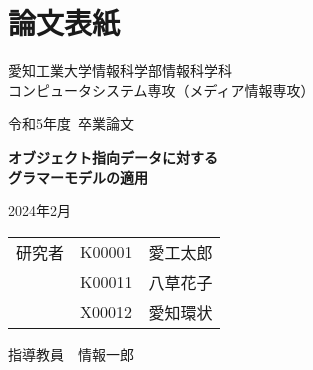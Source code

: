 \chapter{論文表紙}
\thispagestyle{myheadings}

\vspace{-1.0cm}

\begin{center}

{\LARGE 愛知工業大学情報科学部情報科学科\\
コンピュータシステム専攻（メディア情報専攻）

\vspace{1.0cm}

令和5年度~卒業論文\\

\vspace{2.0cm}

{\Huge
\baselineskip=15mm
\textbf{オブジェクト指向データに対する\\
グラマーモデルの適用\\}}

\vspace{7.0cm}

2024年2月\\

\vspace{1.0cm}

\begin{tabular}[h]{lll}
  研究者  & K00001 & 愛工太郎\\
         & K00011 & 八草花子\\
         & X00012 & 愛知環状\\
\end{tabular}

\vspace{1.0cm}

指導教員\ \ 情報一郎}

\end{center}

